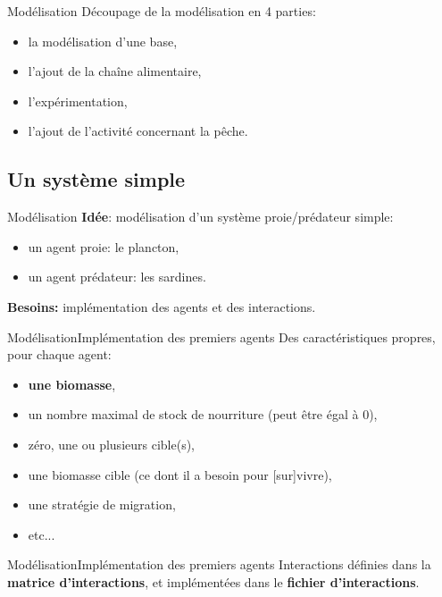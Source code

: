 \documentclass[t, 10pt]{beamer}
\begin{document}
	\begin{frame}[c]{Modélisation}
			Découpage de la modélisation en 4 parties:
			\begin{itemize}
			\item{la modélisation d'une base,}
			\item{l'ajout de la chaîne alimentaire,}
			\item{l'expérimentation,}
			\item{l'ajout de l'activité concernant la pêche.}
			\end{itemize}
	\end{frame}
	
	\subsection{Un système simple}
	
	\begin{frame}[c]{Modélisation}
		\textbf{Idée}: modélisation d'un système proie/prédateur simple:
			\begin{itemize}
			\item{un agent proie: le plancton,}
			\item{un agent prédateur: les sardines.}
			\end{itemize}
		\vfill
		\pause
		\textbf{Besoins:} implémentation des agents et des interactions.
	\end{frame}
	
	\begin{frame}[c]{Modélisation}{Implémentation des premiers agents}
			Des caractéristiques propres, pour chaque agent:
			\begin{itemize}
			\item{\textbf{une biomasse},}
			\item{un nombre maximal de stock de nourriture (peut être égal à 0),}
			\item{zéro, une ou plusieurs cible(s),}
			\item{une biomasse cible (ce dont il a besoin pour [sur]vivre),}
			\item{une stratégie de migration,}
			\item{etc...}
			\end{itemize}
	\end{frame}
	
	\begin{frame}[c]{Modélisation}{Implémentation des premiers agents}
		Interactions définies dans la \textbf{matrice d'interactions}, et implémentées dans le \textbf{fichier d'interactions}. 
	\end{frame}
	
\end{document}
